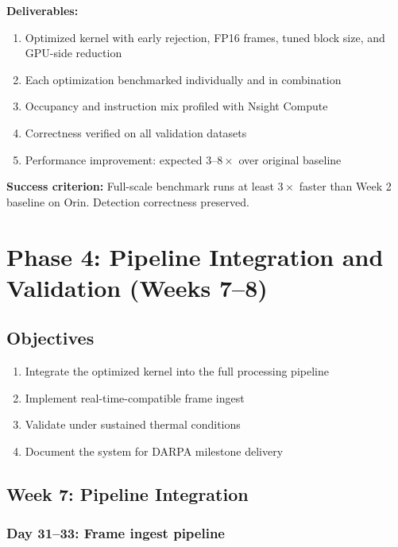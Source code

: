 \documentclass[11pt,letterpaper]{article}
\begin{document}
\begin{milestonebox}
\textbf{Deliverables:}
\begin{enumerate}[leftmargin=2em]
    \item Optimized kernel with early rejection, FP16 frames, tuned
    block size, and GPU-side reduction
    \item Each optimization benchmarked individually and in combination
    \item Occupancy and instruction mix profiled with Nsight Compute
    \item Correctness verified on all validation datasets
    \item Performance improvement: expected $3$--$8\times$ over original
    baseline
\end{enumerate}
\textbf{Success criterion:} Full-scale benchmark runs at least $3\times$
faster than Week 2 baseline on Orin. Detection correctness preserved.
\end{milestonebox}

\section{Phase 4: Pipeline Integration and Validation (Weeks 7--8)}
\label{sec:phase4}

\subsection{Objectives}

\begin{enumerate}[leftmargin=2em]
    \item Integrate the optimized kernel into the full processing pipeline
    \item Implement real-time-compatible frame ingest
    \item Validate under sustained thermal conditions
    \item Document the system for DARPA milestone delivery
\end{enumerate}

\subsection{Week 7: Pipeline Integration}

\subsubsection{Day 31--33: Frame ingest pipeline}
\end{document}
